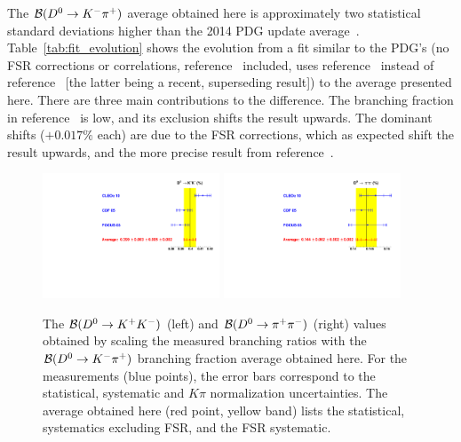 The ${\cal B}(D^0\to K^-\pi^+)$ average obtained here is 
approximately two statistical standard deviations higher than the
2014 PDG update average~\cite{PDG_2014}. 
Table~\ref{tab:fit_evolution} shows the evolution from a
fit similar to the PDG's (no FSR corrections or correlations, 
reference~\cite{Coan:1997ye}
included, uses reference~\cite{Dobbs:2007zt} instead of reference~\cite{Bonvicini:2013vxi} [the latter being a recent, superseding result]) to the average presented here.
There are three main contributions to the difference. The branching 
fraction in reference~\cite{Coan:1997ye} is
low, and its exclusion shifts the result upwards. The dominant shifts
($+0.017\%$ each) are due to the FSR corrections, which as
expected shift the result upwards, and the more precise result from
reference~\cite{Bonvicini:2013vxi}.
\begin{figure}
\begin{center}
\includegraphics[width=0.47\textwidth,angle=0.]{figures/charm/D0KK_2014.pdf}\hfill
\includegraphics[width=0.47\textwidth,angle=0.]{figures/charm/D0pipi_2014.pdf}
\caption{The ${\cal B}(D^0\to K^+K^-)$ (left) and ${\cal B}(D^0\to \pi^+\pi^-)$ (right) 
values obtained by scaling the measured branching ratios with the ${\cal B}(D^0\to K^-\pi^+)$ branching fraction
average obtained here.  For the measurements (blue points), the error bars correspond to the statistical, systematic
and $K\pi$ normalization uncertainties.  The average obtained here (red point, yellow band) lists the statistical,
systematics excluding FSR, and the FSR systematic.
\label{fig:kkpipi}}
\end{center}
\end{figure}


